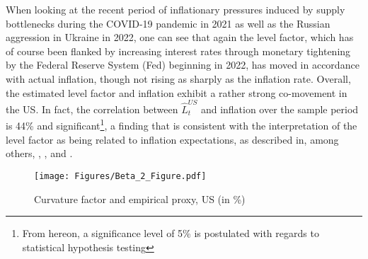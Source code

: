 When looking at the recent period of inflationary pressures induced by supply bottlenecks during the COVID-19 pandemic in 2021 as well as the Russian aggression in Ukraine in 2022, one can see that again the level factor, which has of course been flanked by increasing interest rates through monetary tightening by the Federal Reserve System (Fed) beginning in 2022, has moved in accordance with actual inflation, though not rising as sharply as the inflation rate. 
Overall, the estimated level factor and inflation exhibit a rather strong co-movement in the US.
In fact, the correlation between $\hat{L}^{US}_{t}$ and inflation over the sample period is 44\% and significant\footnote{From hereon, a significance level of 5\% is postulated with regards to statistical hypothesis testing}, a finding that is consistent with the interpretation of the level factor as being related to inflation expectations, as described in, among others, \citet{dewachter2006macro}, \citet{rudebusch2008macro}, and \citet{diebold2006macroeconomy}.



\begin{figure}[!t]
    \centering
    \texttt{[image: Figures/Beta\_2\_Figure.pdf]}
    \caption{Curvature factor and empirical proxy, US (in \%)}
    \label{fig:curvature_factor_us}
\end{figure}


